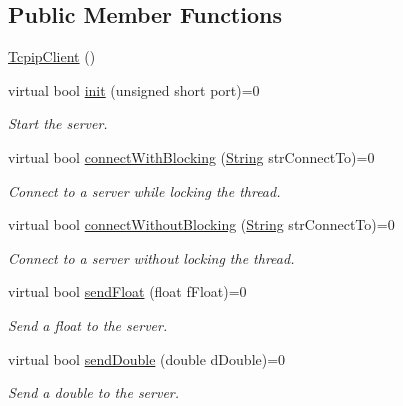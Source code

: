 \subsection*{Public Member Functions}
\begin{DoxyCompactItemize}
\item 
\mbox{\hyperlink{class_rad_j_a_v_1_1_networking_1_1_tcpip_client_aae23fc057bdef796ad8536ddfe9d23f2}{Tcpip\+Client}} ()
\item 
virtual bool \mbox{\hyperlink{class_rad_j_a_v_1_1_networking_1_1_tcpip_client_aba21f2a319d4268bdf04525b1e35ccab}{init}} (unsigned short port)=0
\begin{DoxyCompactList}\small\item\em Start the server. \end{DoxyCompactList}\item 
virtual bool \mbox{\hyperlink{class_rad_j_a_v_1_1_networking_1_1_tcpip_client_ade2497881107c14dd0b3a32ff1f6f669}{connect\+With\+Blocking}} (\mbox{\hyperlink{class_rad_j_a_v_1_1_string}{String}} str\+Connect\+To)=0
\begin{DoxyCompactList}\small\item\em Connect to a server while locking the thread. \end{DoxyCompactList}\item 
virtual bool \mbox{\hyperlink{class_rad_j_a_v_1_1_networking_1_1_tcpip_client_a2125d436db16091fe9c60ed30b34c56e}{connect\+Without\+Blocking}} (\mbox{\hyperlink{class_rad_j_a_v_1_1_string}{String}} str\+Connect\+To)=0
\begin{DoxyCompactList}\small\item\em Connect to a server without locking the thread. \end{DoxyCompactList}\item 
virtual bool \mbox{\hyperlink{class_rad_j_a_v_1_1_networking_1_1_tcpip_client_a0b8da5667dd8c42e8fb358e35b4c8f96}{send\+Float}} (float f\+Float)=0
\begin{DoxyCompactList}\small\item\em Send a float to the server. \end{DoxyCompactList}\item 
virtual bool \mbox{\hyperlink{class_rad_j_a_v_1_1_networking_1_1_tcpip_client_a5f058b50cc9da6de81da6b9f02f2ca24}{send\+Double}} (double d\+Double)=0
\begin{DoxyCompactList}\small\item\em Send a double to the server. \end{DoxyCompactList}\item 

\end{DoxyCompactItemize}
